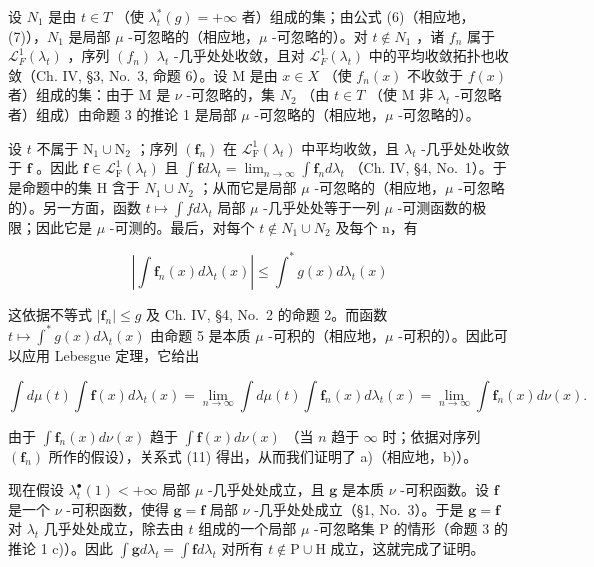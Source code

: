 设 \(N_{1}\) 是由 \(t \in T\) （使 \(\lambda_{t}^{*}(g) = +\infty\) 者）组成的集；由公式 (6)（相应地，(7)），\(N_{1}\) 是局部 \(\mu\) -可忽略的（相应地，\(\mu\) -可忽略的）。对 \(t \notin N_{1}\) ，诸 \(f_{n}\) 属于 \(\mathcal{L}_{F}^{1}(\lambda_{t})\) ，序列 \((f_{n})\) \(\lambda_{t}\) -几乎处处收敛，且对 \(\mathcal{L}_{F}^{1}(\lambda_{t})\) 中的平均收敛拓扑也收敛（Ch. IV, §3, No.~3, 命题 6）。设 M 是由 \(x \in X\) （使 \(f_{n}(x)\) 不收敛于 \(f(x)\) 者）组成的集：由于 M 是 \(\nu\) -可忽略的，集 \(N_{2}\) （由 \(t \in T\) （使 M 非 \(\lambda_{t}\) -可忽略者）组成）由命题 3 的推论 1 是局部 \(\mu\) -可忽略的（相应地，\(\mu\) -可忽略的）。

设 \(t\) 不属于 \(\mathrm{N}_1 \cup \mathrm{N}_2\) ；序列 \((\mathbf{f}_n)\) 在 \(\mathcal{L}_{\mathrm{F}}^{1}(\lambda_t)\) 中平均收敛，且 \(\lambda_t\) -几乎处处收敛于 \(\mathbf{f}\) 。因此 \(\mathbf{f} \in \mathcal{L}_{\mathrm{F}}^{1}(\lambda_t)\) 且 \(\int \mathbf{f} d\lambda_t = \lim_{n \to \infty} \int \mathbf{f}_n d\lambda_t\) （Ch. IV, §4, No.~1）。于是命题中的集 H 含于 \(N_{1} \cup N_{2}\) ；从而它是局部 \(\mu\) -可忽略的（相应地，\(\mu\) -可忽略的）。另一方面，函数 \(t \mapsto \int f d\lambda_{t}\) 局部 \(\mu\) -几乎处处等于一列 \(\mu\) -可测函数的极限；因此它是 \(\mu\) -可测的。最后，对每个 \(t \notin N_{1} \cup N_{2}\) 及每个 n，有

\[
\left| \int \mathbf {f} _ {n} (x) d \lambda_ {t} (x) \right| \leqslant \int^ {*} g (x) d \lambda_ {t} (x)
\]

这依据不等式 \(|\mathbf{f}_n| \leqslant g\) 及 Ch. IV, §4, No.~2 的命题 2。而函数 \(t \mapsto \int^{*} g(x) d\lambda_t(x)\) 由命题 5 是本质 \(\mu\) -可积的（相应地，\(\mu\) -可积的）。因此可以应用 Lebesgue 定理，它给出

\[
\int d \mu (t) \int \mathbf {f} (x) d \lambda_ {t} (x) = \lim _ {n \rightarrow \infty} \int d \mu (t) \int \mathbf {f} _ {n} (x) d \lambda_ {t} (x) = \lim _ {n \rightarrow \infty} \int \mathbf {f} _ {n} (x) d \nu (x).
\]

由于 \(\int \mathbf{f}_n(x) d\nu(x)\) 趋于 \(\int \mathbf{f}(x) d\nu(x)\) （当 \(n\) 趋于 \(\infty\) 时；依据对序列 \((\mathbf{f}_n)\) 所作的假设），关系式 (11) 得出，从而我们证明了 a)（相应地，b)）。

现在假设 \(\lambda_t^\bullet(1) < +\infty\) 局部 \(\mu\) -几乎处处成立，且 \(\mathbf{g}\) 是本质 \(\nu\) -可积函数。设 \(\mathbf{f}\) 是一个 \(\nu\) -可积函数，使得 \(\mathbf{g} = \mathbf{f}\) 局部 \(\nu\) -几乎处处成立（§1, No.~3）。于是 \(\mathbf{g} = \mathbf{f}\) 对 \(\lambda_t\) 几乎处处成立，除去由 \(t\) 组成的一个局部 \(\mu\) -可忽略集 \(\mathrm{P}\) 的情形（命题 3 的推论 1 c)）。因此 \(\int \mathbf{g} d\lambda_t = \int \mathbf{f} d\lambda_t\) 对所有 \(t \notin \mathrm{P} \cup \mathrm{H}\) 成立，这就完成了证明。

